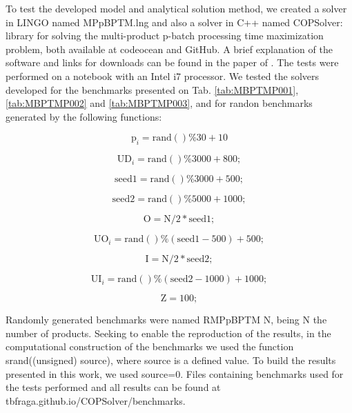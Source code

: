 \documentclass[10pt,fleqn,a4paper,twoside]{article}
\begin{document}
To test the developed model and analytical solution method, we created a solver in LINGO named MPpBPTM.lng and also a solver in C++ named COPSolver: library for solving the multi-product p-batch processing time maximization problem, both available at codeocean and GitHub. A brief explanation of the software and links for downloads can be found in the paper of \cite{Fraga2023}. The tests were performed on a notebook with an Intel i7 processor. We tested the solvers developed for the benchmarks presented on Tab. \ref{tab:MBPTMP001}, \ref{tab:MBPTMP002} and \ref{tab:MBPTMP003}, and for randon benchmarks generated by the following functions:

\begin{equation}
\textrm{p}_i = \textrm{rand}()\%30 + 10
\end{equation}

\begin{equation}
\textrm{UD}_i = \textrm{rand}()\%3000 + 800;
\end{equation}

\begin{equation}
 \textrm{seed1} = \textrm{rand}()\%3000 + 500;
\end{equation}

\begin{equation}
\textrm{seed2} = \textrm{rand}()\%5000 + 1000;
\end{equation}

\begin{equation}
\textrm{O} = \textrm{N}/2*\textrm{seed1};
\end{equation}

\begin{equation}
\textrm{UO}_i = \textrm{rand}()\%(\textrm{seed1}-500) + 500;
\end{equation}

\begin{equation}
\textrm{I} = \textrm{N}/2*\textrm{seed2};
\end{equation}

\begin{equation}
\textrm{UI}_i = \textrm{rand}()\%(\textrm{seed2}-1000) + 1000;
\end{equation}

\begin{equation}
\textrm{Z} = 100;
\end{equation}

Randomly generated benchmarks were named RMPpBPTM $\textrm{N}$, being $\textrm{N}$ the number of products. Seeking to enable the reproduction of the results, in the computational construction of the benchmarks we used the function srand((unsigned) source), where source is a defined value. To build the results presented in this work, we used source=0. Files containing benchmarks used for the tests performed and all results can be found at tbfraga.github.io/COPSolver/benchmarks.
\end{document}
